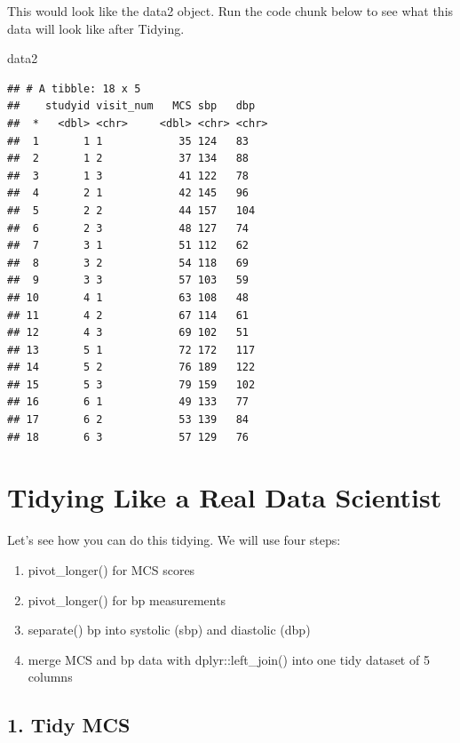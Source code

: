 \documentclass[
]{book}
\newenvironment{Shaded}{\begin{snugshade}}{\end{snugshade}}
\newcommand{\NormalTok}[1]{#1}
\providecommand{\tightlist}{%
  \setlength{\itemsep}{0pt}\setlength{\parskip}{0pt}}
\begin{document}
This would look like the data2 object.
Run the code chunk below to see what this data will look like after Tidying.

\begin{Shaded}
\begin{Highlighting}[]
\NormalTok{data2}
\end{Highlighting}
\end{Shaded}

\begin{verbatim}
## # A tibble: 18 x 5
##    studyid visit_num   MCS sbp   dbp  
##  *   <dbl> <chr>     <dbl> <chr> <chr>
##  1       1 1            35 124   83   
##  2       1 2            37 134   88   
##  3       1 3            41 122   78   
##  4       2 1            42 145   96   
##  5       2 2            44 157   104  
##  6       2 3            48 127   74   
##  7       3 1            51 112   62   
##  8       3 2            54 118   69   
##  9       3 3            57 103   59   
## 10       4 1            63 108   48   
## 11       4 2            67 114   61   
## 12       4 3            69 102   51   
## 13       5 1            72 172   117  
## 14       5 2            76 189   122  
## 15       5 3            79 159   102  
## 16       6 1            49 133   77   
## 17       6 2            53 139   84   
## 18       6 3            57 129   76
\end{verbatim}

\hypertarget{tidying-like-a-real-data-scientist}{%
\section{Tidying Like a Real Data Scientist}\label{tidying-like-a-real-data-scientist}}

Let's see how you can do this tidying.
We will use four steps:

\begin{enumerate}
\def\labelenumi{\arabic{enumi}.}
\tightlist
\item
  pivot\_longer() for MCS scores
\item
  pivot\_longer() for bp measurements
\item
  separate() bp into systolic (sbp) and diastolic (dbp)
\item
  merge MCS and bp data with dplyr::left\_join() into one tidy dataset of 5 columns
\end{enumerate}

\hypertarget{tidy-mcs}{%
\subsection{1. Tidy MCS}\label{tidy-mcs}}
\end{document}

